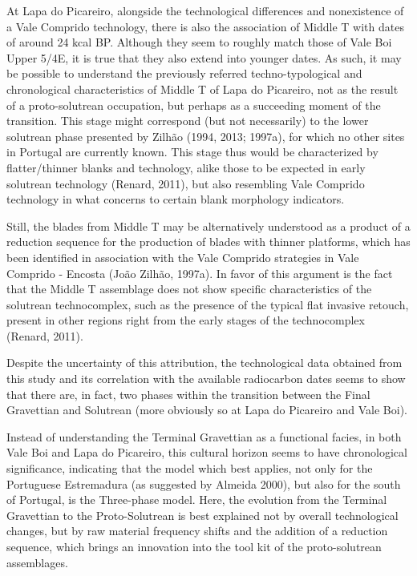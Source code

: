 \documentclass[12pt,twoside]{reedthesis}
\begin{document}
At Lapa do Picareiro, alongside the technological differences and nonexistence of a Vale Comprido technology, there is also the association of Middle T with dates of around 24 kcal BP. Although they seem to roughly match those of Vale Boi Upper 5/4E, it is true that they also extend into younger dates. As such, it may be possible to understand the previously referred techno-typological and chronological characteristics of Middle T of Lapa do Picareiro, not as the result of a proto-solutrean occupation, but perhaps as a succeeding moment of the transition. This stage might correspond (but not necessarily) to the lower solutrean phase presented by Zilhão (1994, 2013; 1997a), for which no other sites in Portugal are currently known. This stage thus would be characterized by flatter/thinner blanks and technology, alike those to be expected in early solutrean technology (Renard, 2011), but also resembling Vale Comprido technology in what concerns to certain blank morphology indicators.

Still, the blades from Middle T may be alternatively understood as a product of a reduction sequence for the production of blades with thinner platforms, which has been identified in association with the Vale Comprido strategies in Vale Comprido - Encosta (João Zilhão, 1997a). In favor of this argument is the fact that the Middle T assemblage does not show specific characteristics of the solutrean technocomplex, such as the presence of the typical flat invasive retouch, present in other regions right from the early stages of the technocomplex (Renard, 2011).

Despite the uncertainty of this attribution, the technological data obtained from this study and its correlation with the available radiocarbon dates seems to show that there are, in fact, two phases within the transition between the Final Gravettian and Solutrean (more obviously so at Lapa do Picareiro and Vale Boi).

Instead of understanding the Terminal Gravettian as a functional facies, in both Vale Boi and Lapa do Picareiro, this cultural horizon seems to have chronological significance, indicating that the model which best applies, not only for the Portuguese Estremadura (as suggested by Almeida 2000), but also for the south of Portugal, is the Three-phase model. Here, the evolution from the Terminal Gravettian to the Proto-Solutrean is best explained not by overall technological changes, but by raw material frequency shifts and the addition of a reduction sequence, which brings an innovation into the tool kit of the proto-solutrean assemblages.
\end{document}
